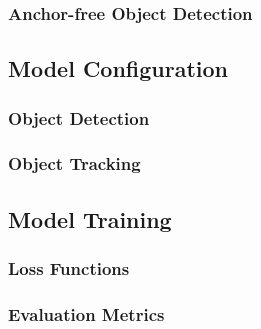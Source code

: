 
\subsubsection{Anchor-free Object Detection}


\subsection{Model Configuration}

\subsubsection{Object Detection}

\subsubsection{Object Tracking}

\subsection{Model Training}




\subsubsection{Loss Functions}




\subsubsection{Evaluation Metrics}



